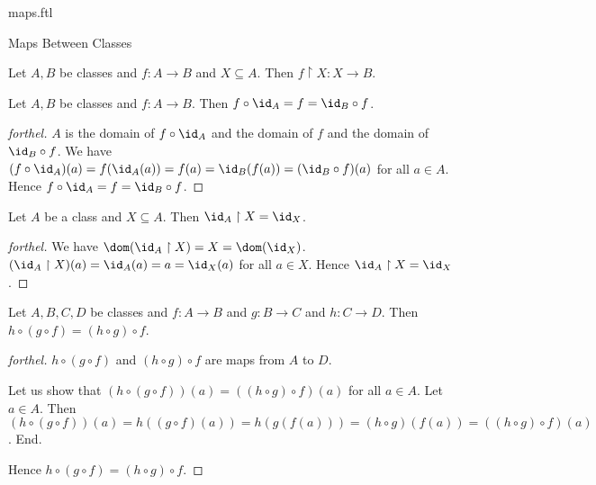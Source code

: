 \documentclass{naproche-library}
\begin{document}
\begin{smodule}[title=Maps]{maps.ftl}
\begin{sfragment}{Maps Between Classes}
  \begin{proposition}[forthel,id=FOUNDATIONS_06_4078561256275968]
    Let $A, B$ be classes and $f : A \to B$ and $X \subseteq A$.
    Then $f \restriction X : X \to B$.
  \end{proposition}

  \begin{proposition}[forthel,id=FOUNDATIONS_06_3964401904254976]
    Let $A, B$ be classes and $f : A \to B$.
    Then $f \circ \id_{A} = f = \id_{B} \circ f$.
  \end{proposition}
  \begin{proof}[forthel]
    $A$ is the domain of $f \circ \id_{A}$ and the domain of $f$ and the domain of $\id_{B} \circ f$.
    We have $(f \circ \id_{A})(a)
      = f(\id_{A}(a))
      = f(a)
      = \id_{B}(f(a))
      = (\id_{B} \circ f)(a)$
    for all $a \in A$.
    Hence $f \circ \id_{A}
      = f
      = \id_{B} \circ f$.
  \end{proof}

  \begin{proposition}[forthel,id=FOUNDATIONS_06_3118771061391360]
    Let $A$ be a class and $X \subseteq A$.
    Then $\id_{A} \restriction X = \id_{X}$.
  \end{proposition}
  \begin{proof}[forthel]
    We have $\dom(\id_{A} \restriction X)
      = X
      = \dom(\id_{X})$.
    $(\id_{A} \restriction X)(a)
      = \id_{A}(a)
      = a
      = \id_{X}(a)$
    for all $a \in X$.
    Hence $\id_{A} \restriction X = \id_{X}$.
  \end{proof}

  \begin{proposition}[forthel,id=FOUNDATIONS_06_6866147389472768]
    Let $A, B, C, D$ be classes and $f : A \to B$ and $g : B \to C$ and $h : C \to D$.
    Then $h \circ (g \circ f) = (h \circ g) \circ f$.
  \end{proposition}
  \begin{proof}[forthel]
    $h \circ (g \circ f)$ and $(h \circ g) \circ f$ are maps from $A$ to $D$.

    Let us show that $(h \circ (g \circ f))(a) = ((h \circ g) \circ f)(a)$ for all $a \in A$.
      Let $a \in A$.
      Then $(h \circ (g \circ f))(a)
        = h((g \circ f)(a))
        = h(g(f(a)))
        = (h \circ g)(f(a))
        = ((h \circ g) \circ f)(a)$.
    End.

    Hence $h \circ (g \circ f) = (h \circ g) \circ f$.
  \end{proof}
\end{sfragment}


\end{smodule}
\end{document}
